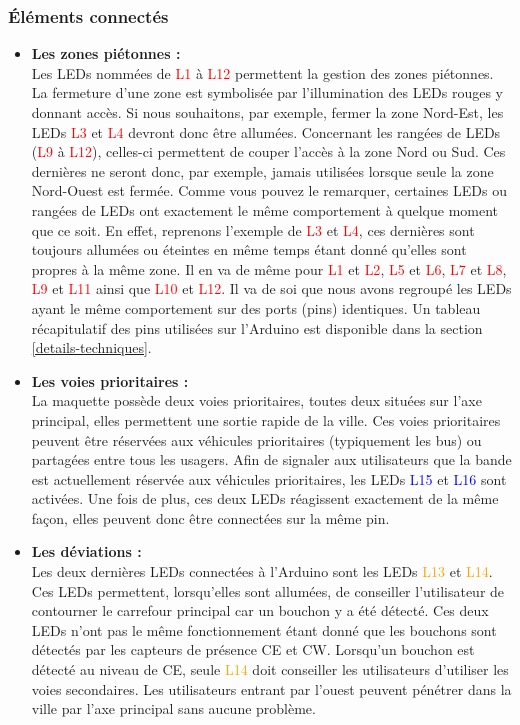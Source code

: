 \subsubsection{Éléments connectés}
\begin{itemize}
\item \textbf{Les zones piétonnes :}\\
Les LEDs nommées de \textcolor{red}{L1} à \textcolor{red}{L12} permettent la gestion des zones piétonnes. La fermeture d’une zone est symbolisée par l’illumination des LEDs rouges y donnant accès. Si nous souhaitons, par exemple, fermer la zone Nord-Est, les LEDs \textcolor{red}{L3} et \textcolor{red}{L4} devront donc être allumées. Concernant les rangées de LEDs (\textcolor{red}{L9} à \textcolor{red}{L12}), celles-ci permettent de couper l’accès à la zone Nord ou Sud. Ces dernières ne seront donc, par exemple, jamais utilisées lorsque seule la zone Nord-Ouest est fermée.
Comme vous pouvez le remarquer, certaines LEDs ou rangées de LEDs ont exactement le même comportement à quelque moment que ce soit. En effet, reprenons l’exemple de \textcolor{red}{L3} et \textcolor{red}{L4}, ces dernières sont toujours allumées ou éteintes en même temps étant donné qu’elles sont propres à la même zone. Il en va de même pour \textcolor{red}{L1} et \textcolor{red}{L2}, \textcolor{red}{L5} et \textcolor{red}{L6}, \textcolor{red}{L7} et \textcolor{red}{L8}, \textcolor{red}{L9} et \textcolor{red}{L11} ainsi que \textcolor{red}{L10} et \textcolor{red}{L12}. Il va de soi que nous avons regroupé les LEDs ayant le même comportement sur des ports (pins) identiques. Un tableau récapitulatif des pins utilisées sur l’Arduino est disponible dans la section \ref{details-techniques}.

\item \textbf{Les voies prioritaires :}\\
La maquette possède deux voies prioritaires, toutes deux situées sur l’axe principal, elles permettent une sortie rapide de la ville. Ces voies prioritaires peuvent être réservées aux véhicules prioritaires (typiquement les bus) ou partagées entre tous les usagers. Afin de signaler aux utilisateurs que la bande est actuellement réservée aux véhicules prioritaires, les LEDs \textcolor{blue}{L15} et \textcolor{blue}{L16} sont activées. Une fois de plus, ces deux LEDs réagissent exactement de la même façon, elles peuvent donc être connectées sur la même pin.

\item \textbf{Les déviations :}\\
Les deux dernières LEDs connectées à l’Arduino sont les LEDs \textcolor{orange}{L13} et \textcolor{orange}{L14}. Ces LEDs permettent, lorsqu’elles sont allumées, de conseiller l’utilisateur de contourner le carrefour principal car un bouchon y a été détecté. Ces deux LEDs n’ont pas le même fonctionnement étant donné que les bouchons sont détectés par les capteurs de présence CE et CW. Lorsqu’un bouchon est détecté au niveau de CE, seule \textcolor{orange}{L14} doit conseiller les utilisateurs d’utiliser les voies secondaires. Les utilisateurs entrant par l’ouest peuvent pénétrer dans la ville par l’axe principal sans aucune problème.


\end{itemize}
